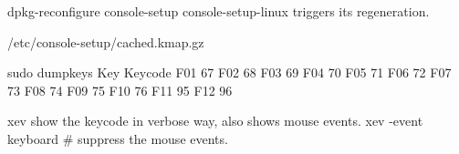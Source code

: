 
\renewcommand{\footerfilename}{KeyboardEvents.tex}

dpkg-reconfigure console-setup console-setup-linux triggers its regeneration.

/etc/console-setup/cached.kmap.gz

sudo dumpkeys
Key   Keycode
F01      67
F02      68
F03      69
F04      70
F05      71
F06      72
F07      73
F08      74
F09      75
F10      76
F11      95
F12      96


xev show the keycode in verbose way, also shows mouse events.
xev -event keyboard # suppress the mouse events.


